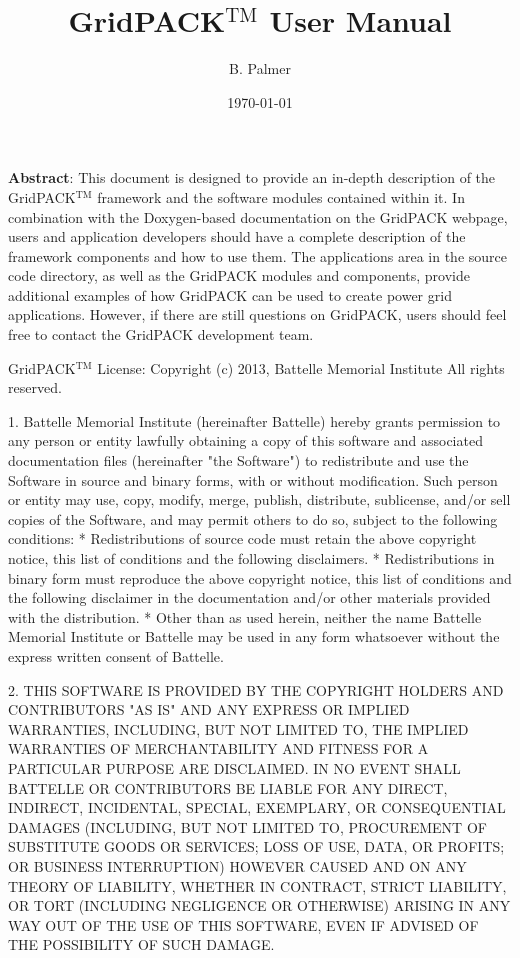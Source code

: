 \documentclass[12pt]{report} %
\begin{document}



\title{GridPACK$\mathrm{{}^{TM}}$ User Manual}
\author{B. Palmer}
\date{\today}
\maketitle



\textbf{Abstract}:
This document is designed to provide an in-depth description of the GridPACK$\mathrm{{}^{TM}}$ framework and the software modules contained within it. In combination with the Doxygen-based documentation on the GridPACK webpage, users and application developers should have a complete description of the framework components and how to use them. The applications area in the source code directory, as well as the GridPACK modules and components, provide additional examples of how GridPACK can be used to create power grid applications. However, if there are still questions on GridPACK, users should feel free to contact the GridPACK development team.
\eject 

GridPACK$\mathrm{{}^{TM}}$ License: Copyright (c) 2013, Battelle Memorial Institute All rights reserved.

1. Battelle Memorial Institute (hereinafter Battelle) hereby grants permission to any person or entity lawfully obtaining a copy of this software and associated documentation files (hereinafter "the Software") to redistribute and use the Software in source and binary forms, with or without modification.  Such person or entity may use, copy, modify, merge, publish, distribute, sublicense, and/or sell copies of the Software, and may permit others to do so, subject to the following conditions:
* Redistributions of source code must retain the above copyright notice, this list of conditions and the following disclaimers. 
* Redistributions in binary form must reproduce the above copyright notice, this list of conditions and the following disclaimer in the documentation and/or other materials provided with the distribution. 
* Other than as used herein, neither the name Battelle Memorial Institute or Battelle may be used in any form whatsoever without the express written consent of Battelle.   

2.      THIS SOFTWARE IS PROVIDED BY THE COPYRIGHT HOLDERS AND CONTRIBUTORS "AS IS" AND ANY EXPRESS OR IMPLIED WARRANTIES, INCLUDING, BUT NOT LIMITED TO, THE IMPLIED WARRANTIES OF MERCHANTABILITY AND FITNESS FOR A PARTICULAR PURPOSE ARE DISCLAIMED. IN NO EVENT SHALL BATTELLE OR CONTRIBUTORS BE LIABLE FOR ANY DIRECT, INDIRECT, INCIDENTAL, SPECIAL, EXEMPLARY, OR CONSEQUENTIAL DAMAGES (INCLUDING, BUT NOT LIMITED TO, PROCUREMENT OF SUBSTITUTE GOODS OR SERVICES; LOSS OF USE, DATA, OR PROFITS; OR BUSINESS INTERRUPTION) HOWEVER CAUSED AND ON ANY THEORY OF LIABILITY, WHETHER IN CONTRACT, STRICT LIABILITY, OR TORT (INCLUDING NEGLIGENCE OR OTHERWISE) ARISING IN ANY WAY OUT OF THE USE OF THIS SOFTWARE, EVEN IF ADVISED OF THE POSSIBILITY OF SUCH DAMAGE.
\end{document}
